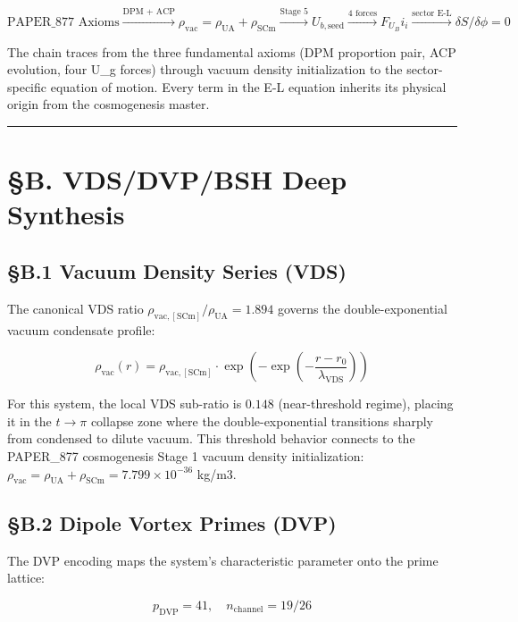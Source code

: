 \documentclass[12pt,a4paper]{article}
\begin{document}
\begin{equation}
\text{PAPER\_877 Axioms} \xrightarrow{\text{DPM + ACP}} \rho_{\mathrm{vac}} = \rho_{\mathrm{UA}} + \rho_{\mathrm{SCm}} \xrightarrow{\text{Stage 5}} U_{b,\mathrm{seed}} \xrightarrow{\text{4 forces}} F_U_Bi_i \xrightarrow{\text{sector E-L}} \delta S/\delta \phi = 0
\end{equation}

The chain traces from the three fundamental axioms (DPM proportion pair, ACP evolution, four U\_g forces) through vacuum density initialization to the sector-specific equation of motion. Every term in the E-L equation inherits its physical origin from the cosmogenesis master.

\medskip\hrule\medskip

\section{\S{}B. VDS/DVP/BSH Deep Synthesis}

\subsection{\S{}B.1 Vacuum Density Series (VDS)}

The canonical VDS ratio $\rho_{\mathrm{vac,[SCm]}} / \rho_{\mathrm{UA}} = 1.894$ governs the double-exponential vacuum condensate profile:

\begin{equation}
\rho_{\mathrm{vac}}(r) = \rho_{\mathrm{vac,[SCm]}} \cdot \exp\!\left(-\exp\!\left(-\frac{r - r_0}{\lambda_{\mathrm{VDS}}}\right)\right)
\end{equation}

For this system, the local VDS sub-ratio is $0.148$ (near-threshold regime), placing it in the $t \to \pi$ collapse zone where the double-exponential transitions sharply from condensed to dilute vacuum. This threshold behavior connects to the PAPER\_877 cosmogenesis Stage 1 vacuum density initialization: $\rho_{\mathrm{vac}} = \rho_{\mathrm{UA}} + \rho_{\mathrm{SCm}} = 7.799 \times 10^{-36}$ kg/m3.

\subsection{\S{}B.2 Dipole Vortex Primes (DVP)}

The DVP encoding maps the system's characteristic parameter onto the prime lattice:

\begin{equation}
p_{\mathrm{DVP}} = 41, \quad n_{\mathrm{channel}} = 19/26
\end{equation}
\end{document}
